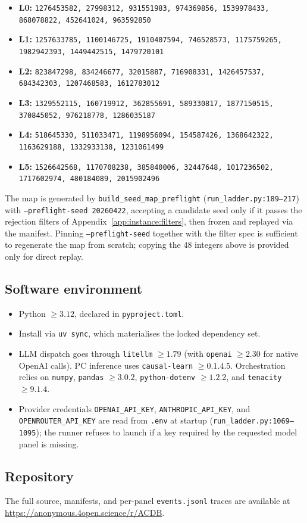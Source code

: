 \begin{itemize}
\itemsep0pt
\item \textbf{L0:} \texttt{1276453582, 27998312, 931551983, 974369856, 1539978433, 868078822, 452641024, 963592850}
\item \textbf{L1:} \texttt{1257633785, 1100146725, 1910407594, 746528573, 1175759265, 1982942393, 1449442515, 1479720101}
\item \textbf{L2:} \texttt{823847298, 834246677, 32015887, 716908331, 1426457537, 684342303, 1207468583, 1612783012}
\item \textbf{L3:} \texttt{1329552115, 160719912, 362855691, 589330817, 1877150515, 370845052, 976218778, 1286035187}
\item \textbf{L4:} \texttt{518645330, 511033471, 1198956094, 154587426, 1368642322, 1163629188, 1332933138, 1231061499}
\item \textbf{L5:} \texttt{1526642568, 1170708238, 385840006, 32447648, 1017236502, 1717602974, 480184089, 2015902496}
\end{itemize}

The map is generated by \texttt{build\_seed\_map\_preflight} (\texttt{run\_ladder.py:189--217}) with \texttt{--preflight-seed 20260422}, accepting a candidate seed only if it passes the rejection filters of Appendix~\ref{app:instance:filters}, then frozen and replayed via the manifest. Pinning \texttt{--preflight-seed} together with the filter spec is sufficient to regenerate the map from scratch; copying the 48 integers above is provided only for direct replay.

\subsection{Software environment}
\label{app:repro:env}

\begin{itemize}
\itemsep0pt
\item Python $\ge 3.12$, declared in \texttt{pyproject.toml}.
\item Install via \texttt{uv sync}, which materialises the locked dependency set.
\item LLM dispatch goes through \texttt{litellm} $\ge 1.79$ (with \texttt{openai} $\ge 2.30$ for native OpenAI calls). PC inference uses \texttt{causal-learn} $\ge 0.1.4.5$. Orchestration relies on \texttt{numpy}, \texttt{pandas} $\ge 3.0.2$, \texttt{python-dotenv} $\ge 1.2.2$, and \texttt{tenacity} $\ge 9.1.4$.
\item Provider credentials \texttt{OPENAI\_API\_KEY}, \texttt{ANTHROPIC\_API\_KEY}, and \texttt{OPENROUTER\_API\_KEY} are read from \texttt{.env} at startup (\texttt{run\_ladder.py:1069--1095}); the runner refuses to launch if a key required by the requested model panel is missing.
\end{itemize}

\subsection{Repository}
\label{app:repro:repo}

The full source, manifests, and per-panel \texttt{events.jsonl} traces are available at \url{https://anonymous.4open.science/r/ACDB}.
